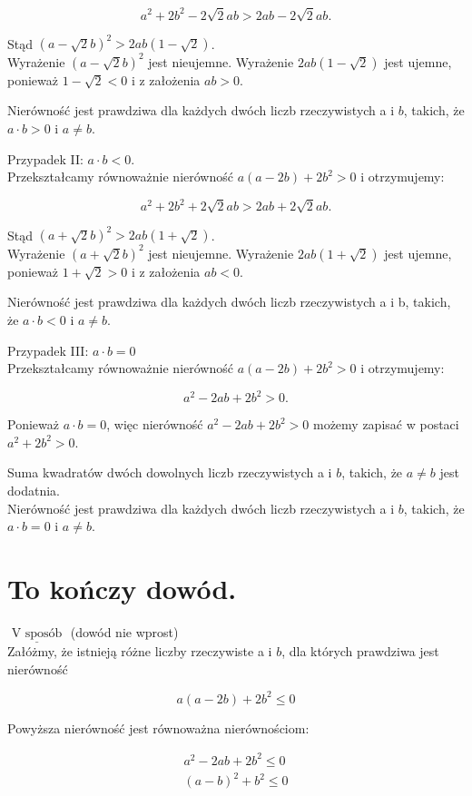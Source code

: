 \documentclass[10pt]{article}
\begin{document}
$$
a^{2}+2 b^{2}-2 \sqrt{2} a b>2 a b-2 \sqrt{2} a b .
$$

Stąd $(a-\sqrt{2} b)^{2}>2 a b(1-\sqrt{2})$.\\
Wyrażenie $(a-\sqrt{2} b)^{2}$ jest nieujemne. Wyrażenie $2 a b(1-\sqrt{2})$ jest ujemne, ponieważ $1-\sqrt{2}<0$ i z założenia $a b>0$.

Nierówność jest prawdziwa dla każdych dwóch liczb rzeczywistych a i $b$, takich, że $a \cdot b>0$ i $a \neq b$.

Przypadek II: $a \cdot b<0$.\\
Przekształcamy równoważnie nierówność $a(a-2 b)+2 b^{2}>0$ i otrzymujemy:

$$
a^{2}+2 b^{2}+2 \sqrt{2} a b>2 a b+2 \sqrt{2} a b .
$$

Stąd $(a+\sqrt{2} b)^{2}>2 a b(1+\sqrt{2})$.\\
Wyrażenie $(a+\sqrt{2} b)^{2}$ jest nieujemne. Wyrażenie $2 a b(1+\sqrt{2})$ jest ujemne, ponieważ $1+\sqrt{2}>0$ i z założenia $a b<0$.

Nierówność jest prawdziwa dla każdych dwóch liczb rzeczywistych a i b, takich, że $a \cdot b<0$ i $a \neq b$.

Przypadek III: $a \cdot b=0$\\
Przekształcamy równoważnie nierówność $a(a-2 b)+2 b^{2}>0$ i otrzymujemy:

$$
a^{2}-2 a b+2 b^{2}>0 .
$$

Ponieważ $a \cdot b=0$, więc nierówność $a^{2}-2 a b+2 b^{2}>0$ możemy zapisać w postaci $a^{2}+2 b^{2}>0$.

Suma kwadratów dwóch dowolnych liczb rzeczywistych a i $b$, takich, że $a \neq b$ jest dodatnia.\\
Nierówność jest prawdziwa dla każdych dwóch liczb rzeczywistych a i $b$, takich, że $a \cdot b=0$ i $a \neq b$.

\section*{To kończy dowód.}
$\underline{\text { V sposób }}$ (dowód nie wprost)\\
Załóżmy, że istnieją różne liczby rzeczywiste a i $b$, dla których prawdziwa jest nierówność

$$
a(a-2 b)+2 b^{2} \leq 0
$$

Powyższa nierówność jest równoważna nierównościom:

$$
\begin{gathered}
a^{2}-2 a b+2 b^{2} \leq 0 \\
(a-b)^{2}+b^{2} \leq 0
\end{gathered}
$$
\end{document}
